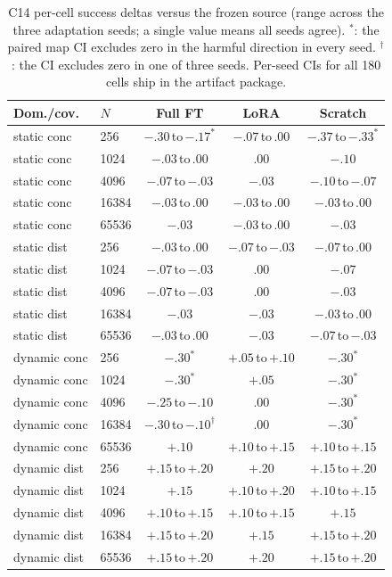 \documentclass[letterpaper]{article} %
\newcommand{\stage}[1]{\textsc{#1}}
\begin{document}
\begin{table}[t]
\centering
\small
\setlength{\tabcolsep}{1.4pt}
\begin{tabular}{@{}llccc@{}}
\toprule
Dom./cov. & $N$ & Full FT & LoRA & Scratch \\
\midrule
static conc & 256 & $-.30$\,to\,$-.17^{*}$ & $-.07$\,to\,$.00$ & $-.37$\,to\,$-.33^{*}$ \\
static conc & 1024 & $-.03$\,to\,$.00$ & $.00$ & $-.10$ \\
static conc & 4096 & $-.07$\,to\,$-.03$ & $-.03$ & $-.10$\,to\,$-.07$ \\
static conc & 16384 & $-.03$\,to\,$.00$ & $-.03$\,to\,$.00$ & $-.03$\,to\,$.00$ \\
static conc & 65536 & $-.03$ & $-.03$\,to\,$.00$ & $-.03$ \\
static dist & 256 & $-.03$\,to\,$.00$ & $-.07$\,to\,$-.03$ & $-.07$\,to\,$.00$ \\
static dist & 1024 & $-.07$\,to\,$-.03$ & $.00$ & $-.07$ \\
static dist & 4096 & $-.07$\,to\,$-.03$ & $.00$ & $-.03$ \\
static dist & 16384 & $-.03$ & $-.03$ & $-.03$\,to\,$.00$ \\
static dist & 65536 & $-.03$\,to\,$.00$ & $-.03$ & $-.07$\,to\,$-.03$ \\
dynamic conc & 256 & $-.30^{*}$ & $+.05$\,to\,$+.10$ & $-.30^{*}$ \\
dynamic conc & 1024 & $-.30^{*}$ & $+.05$ & $-.30^{*}$ \\
dynamic conc & 4096 & $-.25$\,to\,$-.10$ & $.00$ & $-.30^{*}$ \\
dynamic conc & 16384 & $-.30$\,to\,$-.10^{\dagger}$ & $.00$ & $-.30^{*}$ \\
dynamic conc & 65536 & $+.10$ & $+.10$\,to\,$+.15$ & $+.10$\,to\,$+.15$ \\
dynamic dist & 256 & $+.15$\,to\,$+.20$ & $+.20$ & $+.15$\,to\,$+.20$ \\
dynamic dist & 1024 & $+.15$ & $+.10$\,to\,$+.20$ & $+.10$\,to\,$+.15$ \\
dynamic dist & 4096 & $+.10$\,to\,$+.15$ & $+.10$\,to\,$+.15$ & $+.15$ \\
dynamic dist & 16384 & $+.15$\,to\,$+.20$ & $+.15$ & $+.15$\,to\,$+.20$ \\
dynamic dist & 65536 & $+.15$\,to\,$+.20$ & $+.20$ & $+.15$\,to\,$+.20$ \\
\bottomrule
\end{tabular}
\caption{\stage{C14} per-cell success deltas versus the frozen source (range across the three adaptation seeds; a single value means all seeds agree). $^{*}$: the paired map CI excludes zero in the harmful direction in every seed. $^{\dagger}$: the CI excludes zero in one of three seeds. Per-seed CIs for all 180 cells ship in the artifact package.}
\label{tab:c14cells}
\end{table}
\end{document}
